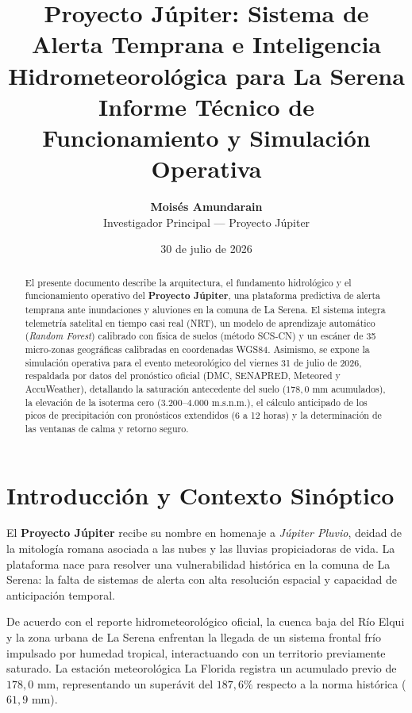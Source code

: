\documentclass[11pt,a4paper]{article}
\title{\textbf{Proyecto Júpiter: Sistema de Alerta Temprana e Inteligencia Hidrometeorológica para La Serena}\\
\large Informe Técnico de Funcionamiento y Simulación Operativa}
\author{\textbf{Moisés Amundarain}\\
Investigador Principal --- Proyecto Júpiter}
\date{30 de julio de 2026}
\begin{document}
\spanishdeactivate{><}

\maketitle

\begin{abstract}
El presente documento describe la arquitectura, el fundamento hidrológico y el funcionamiento operativo del \textbf{Proyecto Júpiter}, una plataforma predictiva de alerta temprana ante inundaciones y aluviones en la comuna de La Serena. El sistema integra telemetría satelital en tiempo casi real (NRT), un modelo de aprendizaje automático (\textit{Random Forest}) calibrado con física de suelos (método SCS-CN) y un escáner de 35 micro-zonas geográficas calibradas en coordenadas WGS84. Asimismo, se expone la simulación operativa para el evento meteorológico del viernes 31 de julio de 2026, respaldada por datos del pronóstico oficial (DMC, SENAPRED, Meteored y AccuWeather), detallando la saturación antecedente del suelo ($178,0\text{ mm}$ acumulados), la elevación de la isoterma cero ($3.200$--$4.000\text{ m.s.n.m.}$), el cálculo anticipado de los picos de precipitación con pronósticos extendidos (6 a 12 horas) y la determinación de las ventanas de calma y retorno seguro.
\end{abstract}

\section{Introducción y Contexto Sinóptico}

El \textbf{Proyecto Júpiter} recibe su nombre en homenaje a \textit{Júpiter Pluvio}, deidad de la mitología romana asociada a las nubes y las lluvias propiciadoras de vida. La plataforma nace para resolver una vulnerabilidad histórica en la comuna de La Serena: la falta de sistemas de alerta con alta resolución espacial y capacidad de anticipación temporal.

De acuerdo con el reporte hidrometeorológico oficial, la cuenca baja del Río Elqui y la zona urbana de La Serena enfrentan la llegada de un sistema frontal frío impulsado por humedad tropical, interactuando con un territorio previamente saturado. La estación meteorológica La Florida registra un acumulado previo de $178,0\text{ mm}$, representando un superávit del $187,6\%$ respecto a la norma histórica ($61,9\text{ mm}$).
\end{document}
